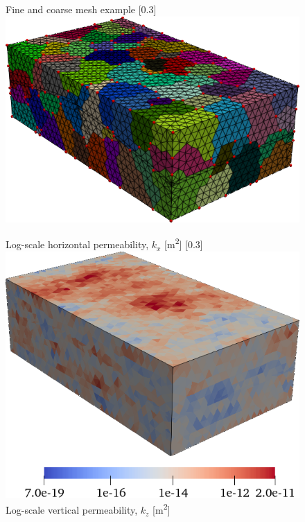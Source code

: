 \begin{figure} [htbp]
{    }
    \hfill
    \subcaptionbox
    {
        Fine and coarse mesh example
        \label{fig:mazumodel2_matlab_setup_coarse_mesh}
    }
    [0.3\textwidth]
    {
        \includegraphics[width=\linewidth]{figs/MazuModel2/matlab/coarse_mesh}
    }
    \par\bigskip
    \subcaptionbox
    {
        Log-scale horizontal permeability, $k_x$ [\unit{m^2}]
        \label{fig:mazumodel2_matlab_setup_permx}
    }
    [0.3\textwidth]
    {
        \includegraphics[width=\linewidth]{figs/MazuModel2/matlab/permx}
    }
    \hfill
    \subcaptionbox
    {
        Log-scale vertical permeability, $k_z$ [\unit{m^2}]
        \label{fig:mazumodel2_matlab_setup_permz}
}
\end{figure}
